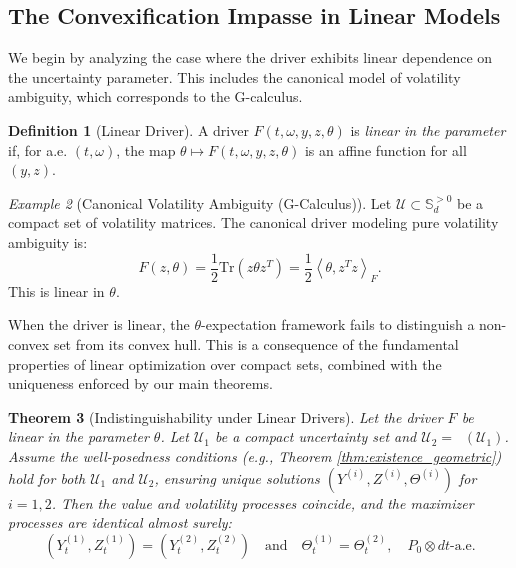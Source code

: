 \documentclass[12pt, letterpaper]{amsart}
\newcommand{\Ucal}{\mathcal{U}}
\newcommand{\Sdp}{\mathbb{S}_d^{>0}}
\newcommand{\scpr}[2]{\left\langle #1, #2 \right\rangle}
\newcommand{\Tr}{\mathrm{Tr}}
\DeclareMathOperator*{\overlineconv}{\overline{conv}}
\theoremstyle{plain}
\newtheorem{theorem}{Theorem}[section]
\theoremstyle{definition}
\newtheorem{definition}[theorem]{Definition}
\theoremstyle{remark}
\newtheorem{example}[theorem]{Example}
\numberwithin{equation}{section} %
\begin{document}
\subsection{The Convexification Impasse in Linear Models}

We begin by analyzing the case where the driver exhibits linear dependence on the uncertainty parameter. This includes the canonical model of volatility ambiguity, which corresponds to the G-calculus.

\begin{definition}[Linear Driver]
\label{def:linear_driver}
A driver \(F(t,\omega,y,z,\theta)\) is \emph{linear in the parameter} if, for a.e. \((t,\omega)\), the map \(\theta \mapsto F(t,\omega,y,z,\theta)\) is an affine function for all \((y,z)\).
\end{definition}

\begin{example}[Canonical Volatility Ambiguity (G-Calculus)]
Let \(\Ucal \subset \Sdp\) be a compact set of volatility matrices. The canonical driver modeling pure volatility ambiguity is:
\[ F(z, \theta) = \frac{1}{2} \Tr(z \theta z^T) = \frac{1}{2} \scpr{\theta}{z^T z}_F. \]
This is linear in \(\theta\).
\end{example}

When the driver is linear, the \(\theta\)-expectation framework fails to distinguish a non-convex set from its convex hull. This is a consequence of the fundamental properties of linear optimization over compact sets, combined with the uniqueness enforced by our main theorems.

\begin{theorem}[Indistinguishability under Linear Drivers]
\label{thm:indistinguishability_linear}
Let the driver \(F\) be linear in the parameter \(\theta\). Let \(\Ucal_1\) be a compact uncertainty set and \(\Ucal_2 = \overlineconv(\Ucal_1)\). Assume the well-posedness conditions (e.g., Theorem \ref{thm:existence_geometric}) hold for both \(\Ucal_1\) and \(\Ucal_2\), ensuring unique solutions \((Y^{(i)}, Z^{(i)}, \Theta^{(i)})\) for \(i=1,2\). Then the value and volatility processes coincide, and the maximizer processes are identical almost surely:
\[ (Y^{(1)}_t, Z^{(1)}_t) = (Y^{(2)}_t, Z^{(2)}_t) \quad \text{and} \quad \Theta^{(1)}_t = \Theta^{(2)}_t, \quad P_0 \otimes dt\text{-a.e.} \]
\end{theorem}
\end{document}

